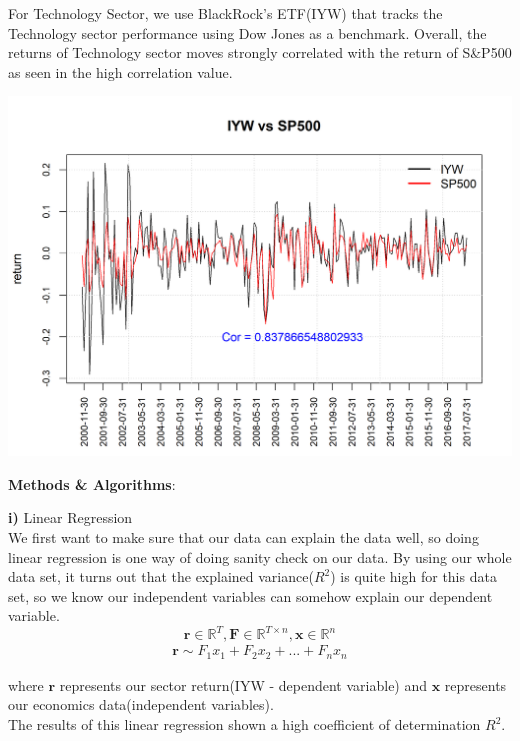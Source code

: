 \documentclass[12pt]{amsart}
\newcommand{\R}{\mathbb{R}}
\begin{document}
For Technology Sector, we use BlackRock's ETF(IYW) that tracks the Technology sector performance using Dow Jones as a benchmark. Overall, the returns of Technology sector moves strongly correlated with the return of S\&P500 as seen in the high correlation value.
\begin{center}
	\includegraphics[scale=0.7]{IYW_vs_SP500}
\end{center}



\newpage

\vskip 8pt \noindent
{\textbf{Methods \& Algorithms}: }
\vskip 8pt \noindent

\textbf{i)} Linear Regression\\
We first want to make sure that our data can explain the data well, so doing linear regression is one way of doing sanity check on our data. By using our whole data set, it turns out that the explained variance($R^{2}$) is quite high for this data set, so we know our independent variables can somehow explain our dependent variable. 
\[ \mathbf{r} \in \R^{T}, \mathbf{F} \in \R^{T \times n}, \mathbf{x} \in \R^{n}
\]
\begin{align*}
\mathbf{r} \sim F_{1}x_{1} + F_{2}x_{2} + ... + F_{n}x_{n}
\end{align*}

where $\mathbf{r}$ represents our sector return(IYW - dependent variable) and $\mathbf{x}$ represents our economics data(independent variables).\\
The results of this linear regression shown a high coefficient of determination $R^{2}$.
\end{document}
